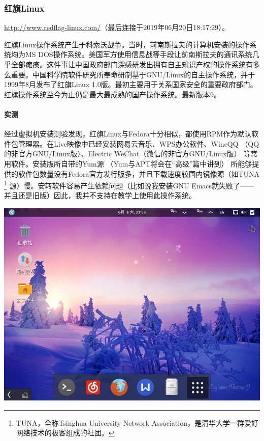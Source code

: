 \subsubsection{红旗Linux}
\url{http://www.redflag-linux.com/}（最后连接于2019年06月20日18:17:29）。 \par
红旗Linux操作系统产生于科索沃战争。当时，前南斯拉夫的计算机安装的操作系统均为MS DOS操作系统。美国军方使用信息战等手段让前南斯拉夫的通讯系统几乎全部瘫痪。这件事让中国政府部门深感研发出拥有自主知识产权的操作系统有多么重要。中国科学院软件研究所奉命研制基于GNU/Linux的自主操作系统，并于1999年8月发布了红旗Linux 1.0版。最初主要用于关系国家安全的重要政府部门。红旗操作系统至今为止仍是最大最成熟的国产操作系统。最新版本9。 \cite{rflinux} \par
\paragraph{实测}
经过虚拟机安装测验发现，红旗Linux与Fedora十分相似，都使用RPM作为默认软件包管理器。在Live映像中已经安装网易云音乐、WPS办公软件、WineQQ （QQ的非官方GNU/Linux版）、Electric WeChat（微信的非官方GNU/Linux版） 等常用软件。安装版所自带的Yum源 （Yum与APT将会在“高级”篇中讲到） 所能够提供的软件包数量没有Fedora官方发行版多，并且下载速度较国内镜像源（如TUNA \footnote{TUNA，全称Tsinghua University Network Association，是清华大学一群爱好网络技术的极客组成的社团。} 源）慢。安转软件容易产生依赖问题（比如说我安装GNU Emacs就失败了——并且还是旧版）因此，我并不支持在教学上使用此操作系统。
\begin{center}
	\includegraphics[scale=0.5]{pic/redflag}
\end{center} \par
